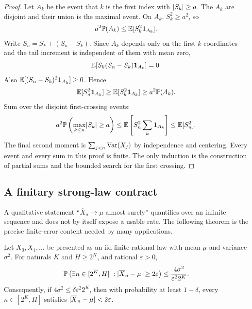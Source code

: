 \begin{proof}
Let \(A_k\) be the event that \(k\) is the first index with
\(\lvert S_k\rvert\ge a\).  The \(A_k\) are disjoint and their union is the maximal
event.  On \(A_k\), \(S_k^2\ge a^2\), so
\[
 a^2\mathbb P(A_k)\le\mathbb E[S_k^2\mathbf 1_{A_k}].
\]
Write \(S_n=S_k+(S_n-S_k)\).  Since \(A_k\) depends only on the first \(k\)
coordinates and the tail increment is independent of them with mean zero,
\[
 \mathbb E[S_k(S_n-S_k)\mathbf 1_{A_k}]=0.
\]
Also \(\mathbb E[(S_n-S_k)^2\mathbf 1_{A_k}]\ge0\).  Hence
\[
 \mathbb E[S_n^2\mathbf 1_{A_k}]\ge\mathbb E[S_k^2\mathbf 1_{A_k}]
 \ge a^2\mathbb P(A_k).
\]
Sum over the disjoint first-crossing events:
\[
 a^2\mathbb P\left(\max_{k\le n}\lvert S_k\rvert\ge a\right)
 \le\mathbb E\left[S_n^2\sum_k\mathbf 1_{A_k}\right]
 \le\mathbb E[S_n^2].
\]
The final second moment is \(\sum_{j<n}\operatorname{Var}(X_j)\) by independence and
centering.  Every event and every sum in this proof is finite.  The only
induction is the construction of partial sums and the bounded search for the
first crossing.
\end{proof}

\subsection{A finitary strong-law contract}

A qualitative statement ``\(\overline X_n\to\mu\) almost surely'' quantifies
over an infinite sequence and does not by itself expose a usable rate.  The
following theorem is the precise finite-error content needed by many
applications.

\begin{theorem}\label{thm:dyadic-slln}
Let \(X_0,X_1,\ldots\) be presented as an iid finite rational law with mean
\(\mu\) and variance \(\sigma^2\).  For naturals \(K\) and \(H\ge2^K\), and
rational \(\varepsilon>0\),
\[
 \mathbb P\left(\exists n\in[2^K,H]\;:
   \lvert \overline X_n-\mu\rvert\ge 2\varepsilon\right)
 \le \frac{4\sigma^2}{\varepsilon^2 2^K}.
\]
Consequently, if
\(4\sigma^2\le\delta\varepsilon^2 2^K\), then with probability at least
\(1-\delta\), every \(n\in[2^K,H]\) satisfies
\(\lvert \overline X_n-\mu\rvert<2\varepsilon\).
\end{theorem}

